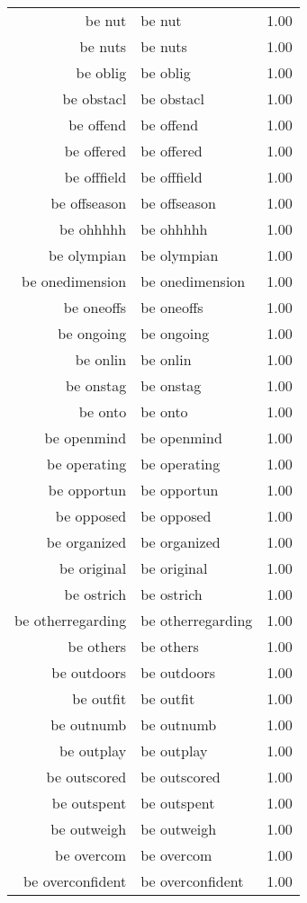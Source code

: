 \begin{table}[ht]
\begin{tabular}{rlr}
  be nut & be nut & 1.00 \\ 
  be nuts & be nuts & 1.00 \\ 
  be oblig & be oblig & 1.00 \\ 
  be obstacl & be obstacl & 1.00 \\ 
  be offend & be offend & 1.00 \\ 
  be offered & be offered & 1.00 \\ 
  be offfield & be offfield & 1.00 \\ 
  be offseason & be offseason & 1.00 \\ 
  be ohhhhh & be ohhhhh & 1.00 \\ 
  be olympian & be olympian & 1.00 \\ 
  be onedimension & be onedimension & 1.00 \\ 
  be oneoffs & be oneoffs & 1.00 \\ 
  be ongoing & be ongoing & 1.00 \\ 
  be onlin & be onlin & 1.00 \\ 
  be onstag & be onstag & 1.00 \\ 
  be onto & be onto & 1.00 \\ 
  be openmind & be openmind & 1.00 \\ 
  be operating & be operating & 1.00 \\ 
  be opportun & be opportun & 1.00 \\ 
  be opposed & be opposed & 1.00 \\ 
  be organized & be organized & 1.00 \\ 
  be original & be original & 1.00 \\ 
  be ostrich & be ostrich & 1.00 \\ 
  be otherregarding & be otherregarding & 1.00 \\ 
  be others & be others & 1.00 \\ 
  be outdoors & be outdoors & 1.00 \\ 
  be outfit & be outfit & 1.00 \\ 
  be outnumb & be outnumb & 1.00 \\ 
  be outplay & be outplay & 1.00 \\ 
  be outscored & be outscored & 1.00 \\ 
  be outspent & be outspent & 1.00 \\ 
  be outweigh & be outweigh & 1.00 \\ 
  be overcom & be overcom & 1.00 \\ 
  be overconfident & be overconfident & 1.00 \\ 

\end{tabular}
\end{table}
